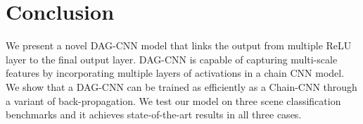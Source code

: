 \documentclass[10pt,twocolumn,letterpaper]{article}
\begin{document}
\section{Conclusion}

We present a novel DAG-CNN model that links the output from multiple ReLU layer to the final output layer. DAG-CNN is capable of capturing multi-scale features by incorporating multiple layers of activations in a chain CNN model. We show that a DAG-CNN can be trained as efficiently as a Chain-CNN through a variant of back-propagation. We test our model on three scene classification benchmarks and it achieves state-of-the-art results in all three cases.


{\small


}
\end{document}
